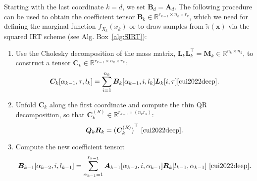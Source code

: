 \begin{prop}
	\label{prob:backMarg}
	Starting with the last coordinate $k = d$, we set $\bm{B}_d = \bm{A}_d$. The following procedure can be used to obtain the coefficient tensor $\bm{B}_{k} \in \mathbb{R}^{r_{k-1} \times n_{k} \times r_{k}}$, which we need for defining the marginal function $f_{X_k}(x_k)$ or to draw samples from $\tilde{\pi}(\bm{x})$ via the squared IRT scheme (see Alg. Box~\ref{alg:SIRT}):
	\begin{enumerate}
		\item Use the Cholesky decomposition of the mass matrix, $\bm{L}_k \bm{L}_k^\top = \bm{M}_k \in \mathbb{R}^{n_k \times n_k}$, to construct a tensor $\bm{C}_k \in \mathbb{R}^{r_{k-1} \times n_k \times r_k}$:
		\begin{equation}
			\bm{C}_k[\alpha_{k-1}, \tau, l_k] = \sum_{i=1}^{n_k} \bm{B}_k[\alpha_{k-1}, i, l_k] \bm{L}_k[i, \tau] \text{\cite[Eq. (27)]{cui2022deep}}. \label{eq:constrCBack}
		\end{equation}
		\item Unfold $\bm{C}_k$ along the first coordinate and compute the thin QR decomposition, so that $\bm{C}_k^{(R)} \in \mathbb{R}^{r_{k-1} \times (n_k r_k)}$:
		\begin{equation}
			\bm{Q}_k \bm{R}_k = {(\bm{C}_k^{(R)})}^{\top} \, \,  \text{\cite[Eq. 28]{cui2022deep}}.\label{eq:thinQRBack}
		\end{equation}
		\item Compute the new coefficient tensor:
		\begin{equation}
			\bm{B}_{k-1}[\alpha_{k-2}, i, l_{k-1}] = \sum_{\alpha_{k-1}=1}^{r_{k-1}} \bm{A}_{k-1}[\alpha_{k-2}, i, \alpha_{k-1}] \bm{R}_k[l_{k-1}, \alpha_{k-1}]\, \,  \text{\cite[Eq. 29]{cui2022deep}}. \label{eq:nextCoeffTBack}
		\end{equation}
	\end{enumerate}
\end{prop}

